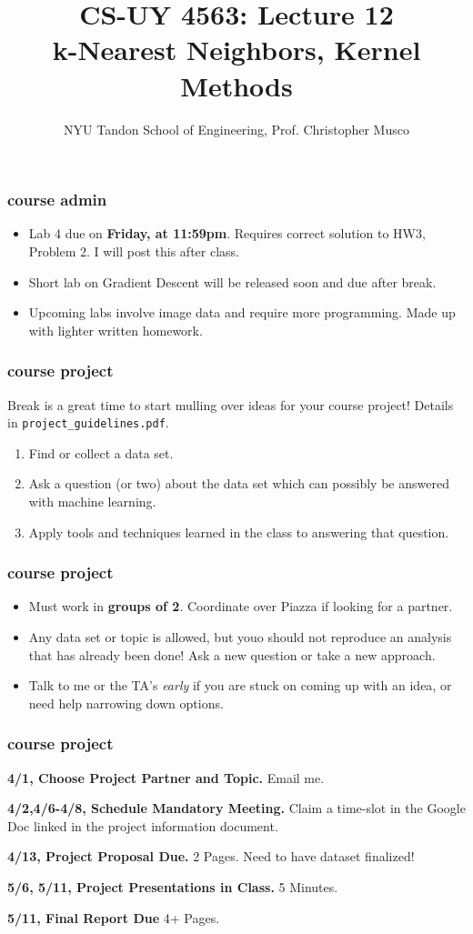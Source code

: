\documentclass[handout,compress]{beamer}
\title{CS-UY 4563: Lecture 12 \\ k-Nearest Neighbors, Kernel Methods}
\author{NYU Tandon School of Engineering, Prof. Christopher Musco}
\date{}
\begin{document}
\begin{frame}
	\titlepage 
\end{frame}


\begin{frame}
	\frametitle{course admin}
	\begin{itemize}
		\item Lab 4 due on \textbf{Friday, at 11:59pm}. Requires correct solution to HW3, Problem 2. I will post this after class. 
		\item Short lab on Gradient Descent will be released soon and due after break. 
		\item Upcoming labs involve image data and require more programming. Made up with lighter written homework.
	\end{itemize}
\end{frame}

\begin{frame}
	\frametitle{course project}
	Break is a great time to start mulling over ideas for your course project!
	Details in \texttt{project\_guidelines.pdf}.
	\begin{enumerate}
		\item Find or collect a data set.
		\item Ask a question (or two) about the data set which can possibly be answered with machine learning. 
		\item Apply tools and techniques learned in the class to answering that question. 
	\end{enumerate}
\end{frame}

\begin{frame}
	\frametitle{course project}
	\begin{itemize}
		\item Must work in \textbf{groups of 2}. Coordinate over Piazza if looking for a partner. 
		\item Any data set or topic is allowed, but youo should not reproduce an analysis that has already been done! Ask a new question or take a new approach. 
		\item Talk to me or the TA's \emph{early} if you are stuck on coming up with an idea, or need help narrowing down options. 
	\end{itemize}
\end{frame}

\begin{frame}
		\frametitle{course project}
			\textbf{4/1, Choose Project Partner and Topic.} Email me.
			
			\textbf{4/2,4/6-4/8, Schedule Mandatory Meeting.} Claim a time-slot in the Google Doc linked in the project information document. 
			
			\textbf{4/13, Project Proposal Due.} 2 Pages. Need to have dataset finalized! 
			
			\textbf{5/6, 5/11, Project Presentations in Class.} 5 Minutes. 
			
			\textbf{5/11, Final Report Due} 4+ Pages. 
\end{frame}
\end{document}
